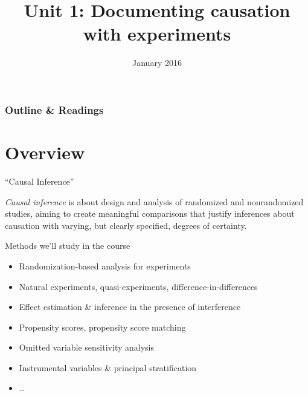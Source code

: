 

%

%




\title{Unit 1: Documenting causation with experiments}
\date{January 2016}




  \begin{frame}
    \frametitle{Outline \& Readings}

\tableofcontents[subsectionstyle=show/hide/hide]

\end{frame}

\itnote{
\item 
}

\section{Overview}

\begin{frame}{``Causal Inference''}

 \textit{Causal inference} is about design and analysis of randomized and nonrandomized studies, aiming to create meaningful comparisons that justify inferences about causation with varying, but clearly specified, degrees of certainty.  
\pause

\end{frame}

\begin{frame}[label=whatWeWillCoverFr]{Methods we'll study in the course}
  \begin{itemize}
  \item Randomization-based analysis for experiments
  \item Natural experiments, quasi-experiments,
    difference-in-differences
  \item Effect estimation \& inference in the presence of interference 
  \item Propensity scores, propensity score matching
  \item Omitted variable sensitivity analysis
  \item Instrumental variables \& principal stratification
  \item \ldots
  \end{itemize}
\end{frame}

